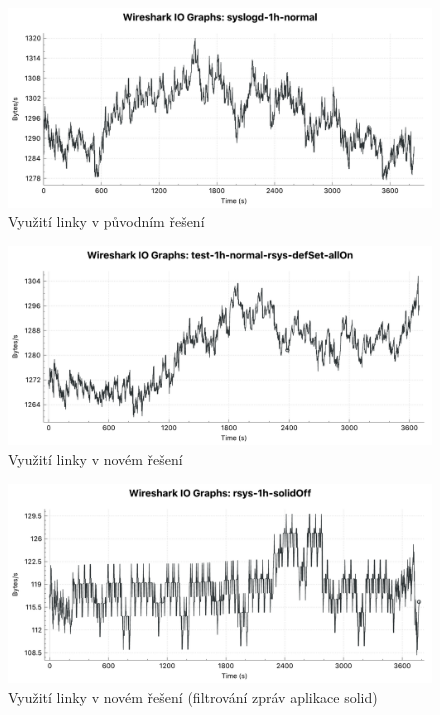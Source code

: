 \documentclass[thesis=B,czech]{FITthesis}[2012/06/26]
\begin{document}
\begin{figure}[H]
	\centering
	\includegraphics[scale=0.44]{images/test-1h-syslogd-default}
	\caption[Využití linky v původním řešení]{Využití linky v původním řešení}
\end{figure}

\begin{figure}[H]
	\centering
	\includegraphics[scale=0.44]{images/test-1h-rsys-default}
	\caption[Využití linky v novém řešení]{Využití linky v novém řešení}
\end{figure}

\begin{figure}[H]
	\centering
	\includegraphics[scale=0.44]{images/test-1h-rsys-solidoff}
	\caption[Využití linky v novém řešení (filtrování zpráv aplikace solid)]{Využití linky v novém řešení (filtrování zpráv aplikace solid)}
\end{figure}
\end{document}
